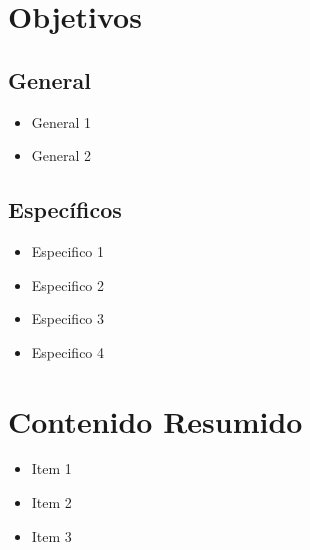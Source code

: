 \documentclass[11pt]{article}
\begin{document}
\section*{Objetivos}

\subsection*{General}

\begin{itemize}
\item General 1 \item General 2 
\end{itemize}

\subsection*{Específicos}

\begin{itemize}
\item Especifico 1 \item Especifico 2 \item Especifico 3 \item Especifico 4 
\end{itemize}

\section*{Contenido Resumido}

\begin{itemize}
\item Item 1 \item Item 2 \item Item 3 
\end{itemize}

\end{document}
